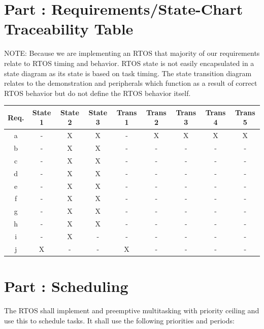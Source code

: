 \documentclass{article}
\newcounter{partNum}
\newcommand{\partNum}{%
        \stepcounter{partNum}%
        \thepartNum}
\newcommand{\sectPart}[1]{\section*{Part \partNum: #1}}
\begin{document}
\newpage

\sectPart{Requirements/State-Chart Traceability Table}

NOTE: Because we are implementing an RTOS that majority of our requirements relate to RTOS timing and behavior. RTOS state is not easily encapsulated in a state diagram as its state is based on task timing. The state transition diagram relates to the demonstration and peripherals which function as a result of correct RTOS behavior but do not define the RTOS behavior itself.

\vspace*{1em}

\begin{center}
    \begin{tabular}{| c | c | c | c | c | c | c | c | c |}
        \hline
    Req. & State 1 & State 2 & State 3 & Trans 1 & Trans 2 & Trans 3 & Trans 4 & Trans 5 \\ \hline
    a & - & X & X & - & X & X & X & X \\ \hline
    b & - & X & X & - & - & - & - & - \\ \hline
    c & - & X & X & - & - & - & - & - \\ \hline
    d & - & X & X & - & - & - & - & - \\ \hline
    e & - & X & X & - & - & - & - & - \\ \hline
    f & - & X & X & - & - & - & - & - \\ \hline
    g & - & X & X & - & - & - & - & - \\ \hline
    h & - & X & X & - & - & - & - & - \\ \hline
    i & - & X & - & - & - & - & - & - \\ \hline
    j & X & - & - & X & - & - & - & - \\ \hline
    \end{tabular}
\end{center}


\sectPart{Scheduling}

The RTOS shall implement and preemptive multitasking with priority ceiling and use this to schedule tasks. It shall use the following priorities and periods:

\vspace{1em}
\end{document}
